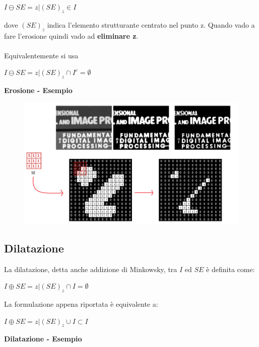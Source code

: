 \begin{center}
    $I \ominus SE = {z|(SE)_z \in I} $
\end{center}

dove $(SE)_z$ indica l'elemento strutturante centrato nel punto z.
Quando vado a fare l'erosione quindi vado ad \textbf{eliminare z}.
\\\\
Equivalentemente si usa

\begin{center}
    $I \ominus SE = {z|(SE)_z \cap I^c = \emptyset}$
\end{center}

\textbf{Erosione - Esempio}

\begin{figure}[H]
    \centering
    \includegraphics[width=\linewidth, keepaspectratio]{capitoli/immagini/imgs/erosione-esempio.png}
\end{figure}

\newpage
\subsection{Dilatazione}

La dilatazione, detta anche addizione di Minkowsky, tra $I$ ed $SE$ è
definita come:

\begin{center}
    $I \oplus SE = {z|(SE)_z \cap I = \emptyset}$
\end{center}

La formulazione appena riportata è equivalente a:

\begin{center}
    $I \oplus SE = {z|(SE)_z \cup I} \subset I$
\end{center}

\textbf{Dilatazione - Esempio}

